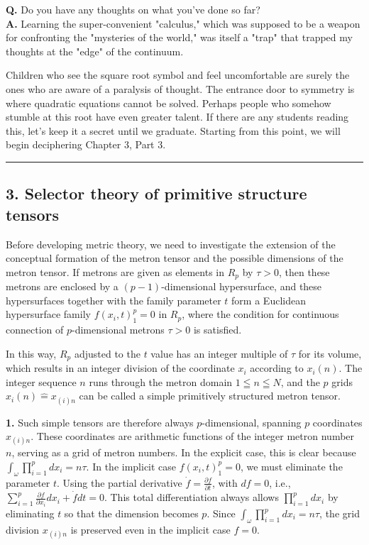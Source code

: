\documentclass[11pt,a4paper,oneside]{article}
\newcommand{\hr}{\par\vspace{2em}\noindent\rule{\linewidth}{0.4pt}\par\vspace{2em}}
\begin{document}
\begin{reflectionbox}[title={Translator's Note: The Edge of the Continuum}]

\textbf{Q.} Do you have any thoughts on what you've done so far? \\
\textbf{A.} Learning the super-convenient "calculus," which was supposed to be a weapon for confronting the "mysteries of the world," was itself a "trap" that trapped my thoughts at the "edge" of the continuum. 

Children who see the square root symbol and feel uncomfortable are surely the ones who are aware of a paralysis of thought. The entrance door to symmetry is where quadratic equations cannot be solved. Perhaps people who somehow stumble at this root have even greater talent. If there are any students reading this, let's keep it a secret until we graduate. Starting from this point, we will begin deciphering Chapter 3, Part 3.
\end{reflectionbox}

\hr

\subsection{3. Selector theory of primitive structure tensors}
Before developing metric theory, we need to investigate the extension of the conceptual formation of the metron tensor and the possible dimensions of the metron tensor. If metrons are given as elements in $R_p$ by $\tau > 0$, then these metrons are enclosed by a $(p-1)$-dimensional hypersurface, and these hypersurfaces together with the family parameter $t$ form a Euclidean hypersurface family $f(x_i,t)_1^p = 0$ in $R_p$, where the condition for continuous connection of $p$-dimensional metrons $\tau > 0$ is satisfied.

In this way, $R_p$ adjusted to the $t$ value has an integer multiple of $\tau$ for its volume, which results in an integer division of the coordinate $x_i$ according to $x_i(n)$. The integer sequence $n$ runs through the metron domain $1 \leqq n \leqq N$, and the $p$ grids $x_i(n) \hat{=} x_{(i)n}$ can be called a simple primitively structured metron tensor.

\textbf{1.} Such simple tensors are therefore always $p$-dimensional, spanning $p$ coordinates $x_{(i)n}$. These coordinates are arithmetic functions of the integer metron number $n$, serving as a grid of metron numbers. In the explicit case, this is clear because $\int_\omega \prod_{i = 1}^p dx_i = n \tau$. In the implicit case $f(x_i,t)_1^p = 0$, we must eliminate the parameter $t$.
Using the partial derivative $\dot {f} = \frac {\partial f}{\partial t}$, with $df = 0$, i.e., $\sum_{i = 1} ^ p \frac {\partial f}{\partial x_i} dx_i + \dot {f} dt = 0$.
This total differentiation always allows $\prod_{i = 1}^p dx_i$ by eliminating $t$ so that the dimension becomes $p$. Since $\int_\omega \prod_{i = 1}^p dx_i = n \tau$, the grid division $x_{(i)n}$ is preserved even in the implicit case $f = 0$.
\end{document}
